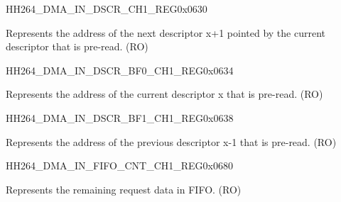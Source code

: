 \begin{register}{H}{H264\_DMA\_IN\_DSCR\_CH1\_REG}{0x0630}\label{regdesc:H264DMAINDSCRCH1REG}
%
\regnewline%
\begin{regdesc}\begin{reglist}
\label{fielddesc:H264DMAINLINKDSCRCH1}\item [H264\_DMA\_INLINK\_DSCR\_CH1] Represents the address of the next descriptor x+1 pointed by the current descriptor that is pre-read. (RO)
\end{reglist}\end{regdesc}
\end{register}


\begin{register}{H}{H264\_DMA\_IN\_DSCR\_BF0\_CH1\_REG}{0x0634}\label{regdesc:H264DMAINDSCRBF0CH1REG}
%
\regnewline%
\begin{regdesc}\begin{reglist}
\label{fielddesc:H264DMAINLINKDSCRBF0CH1}\item [H264\_DMA\_INLINK\_DSCR\_BF0\_CH1] Represents the address of the current descriptor x that is pre-read. (RO)
\end{reglist}\end{regdesc}
\end{register}


\begin{register}{H}{H264\_DMA\_IN\_DSCR\_BF1\_CH1\_REG}{0x0638}\label{regdesc:H264DMAINDSCRBF1CH1REG}
%
\regnewline%
\begin{regdesc}\begin{reglist}
\label{fielddesc:H264DMAINLINKDSCRBF1CH1}\item [H264\_DMA\_INLINK\_DSCR\_BF1\_CH1] Represents the address of the previous descriptor x-1 that is pre-read. (RO)
\end{reglist}\end{regdesc}
\end{register}

\begin{register}{H}{H264\_DMA\_IN\_FIFO\_CNT\_CH1\_REG}{0x0680}\label{regdesc:H264DMAINFIFOCNTCH1REG}
%
%
\regnewline%
\begin{regdesc}\begin{reglist}
\label{fielddesc:H264DMAINCMDFIFOINFIFOCNTCH1}\item [H264\_DMA\_IN\_CMDFIFO\_INFIFO\_CNT\_CH1] Represents the remaining request data in FIFO. (RO)
\end{reglist}\end{regdesc}
\end{register}


